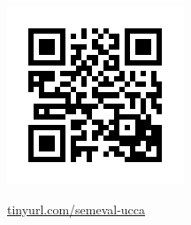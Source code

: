 \documentclass[a0,portrait]{a0poster}
\begin{document}
\begin{multicols}{2}
\begin{multicols}{2}
\begin{adjustbox}{margin=3mm,frame,minipage=\columnwidth}
\begin{minipage}{.3\textwidth}\includegraphics[width=\textwidth]{qr}\end{minipage}
\hfill
\begin{minipage}{.6\textwidth}\Large\url{tinyurl.com/semeval-ucca}\end{minipage}
\end{adjustbox}
\end{multicols}

\end{multicols}
\end{document}
